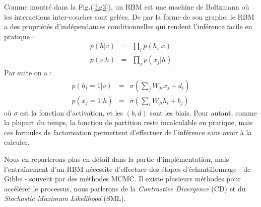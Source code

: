 \documentclass[10pt,a4paper]{article}
\begin{document}
Comme montré dans la Fig.(\ref{fig3}), un RBM est une machine de Boltzmann où les interactions inter-couches sont gelées. De par la forme de son graphe, le RBM a des propriétés d'indépendances conditionnelles qui rendent l'inférence facile en pratique : 
\begin{equation}
\begin{array}{rll}
p(h|v) & = & \displaystyle \prod_{i} p(h_i|x) \\
p(v|h) & = & \displaystyle \prod_{j} p(x_j|h)
\end{array}
\end{equation}
Par suite on a : 
\begin{equation}
\begin{array}{rll}
p(h_i = 1 |v ) & = & \displaystyle \sigma\left(\sum_j W_{ji}x_j + d_i\right) \\
p(x_j = 1 |h ) & = & \displaystyle \sigma\left(\sum_i W_{ji}h_i + b_j\right)
\end{array}
\end{equation}
où $\sigma$ est la fonction d'activation, et les $(b,d)$ sont les biais. Pour autant, comme la plupart du temps, la fonction de partition reste incalculable en pratique, mais ces formules de factorisation permettent d'effectuer de l'inférence sans avoir à la calculer.

Nous en reparlerons plus en détail dans la partie d'implémentation, mais l'entraînement d'un RBM nécessite d'effectuer des étapes d'échantillonnage - de Gibbs - souvent par des méthodes MCMC. Il existe plusieurs méthodes pour accélérer le processus, nous parlerons de la \emph{Contrastive Divergence} (CD) et du \emph{Stochastic Maximum Likelihood} (SML).



\newpage



\end{document}
